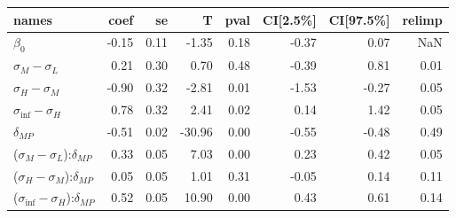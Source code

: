 \begin{tabular}{lrrrrrrr}
\toprule
                                       names &  coef &   se &      T &  pval &  CI[2.5\%] &  CI[97.5\%] &  relimp \\
\midrule
                                 $\beta_{0}$ & -0.15 & 0.11 &  -1.35 &  0.18 &      -0.37 &        0.07 &     NaN \\
                   $\sigma_{M} - \sigma_{L}$ &  0.21 & 0.30 &   0.70 &  0.48 &      -0.39 &        0.81 &    0.01 \\
                   $\sigma_{H} - \sigma_{M}$ & -0.90 & 0.32 &  -2.81 &  0.01 &      -1.53 &       -0.27 &    0.05 \\
                $\sigma_{\inf} - \sigma_{H}$ &  0.78 & 0.32 &   2.41 &  0.02 &       0.14 &        1.42 &    0.05 \\
                               $\delta_{MP}$ & -0.51 & 0.02 & -30.96 &  0.00 &      -0.55 &       -0.48 &    0.49 \\
   ($\sigma_{M} - \sigma_{L}$):$\delta_{MP}$ &  0.33 & 0.05 &   7.03 &  0.00 &       0.23 &        0.42 &    0.05 \\
   ($\sigma_{H} - \sigma_{M}$):$\delta_{MP}$ &  0.05 & 0.05 &   1.01 &  0.31 &      -0.05 &        0.14 &    0.11 \\
($\sigma_{\inf} - \sigma_{H}$):$\delta_{MP}$ &  0.52 & 0.05 &  10.90 &  0.00 &       0.43 &        0.61 &    0.14 \\
\bottomrule
\end{tabular}
